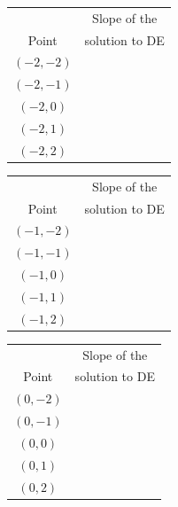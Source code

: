 \documentclass[12pt]{article}
\newcommand{\<}{\langle}
\renewcommand{\>}{\rangle}
\begin{document}
\begin{enumerate}
		\begin{center}
			\begin{tabular}{|c|c|}
				\hline
							& Slope of the	\\
				Point	& solution to DE\\
				\hline
				\hline
				$(-2, -2)$	& \\
				\hline
				$(-2, -1)$	& \\
				\hline
				$(-2, 0)$	& \\
				\hline
				$(-2, 1)$	& \\
				\hline
				$(-2, 2)$	& \\
				\hline
			\end{tabular}
			\hspace{0.5cm}
			\begin{tabular}{|c|c|}
				\hline
							& Slope of the	\\
				Point	& solution to DE\\
				\hline
				\hline
				$(-1, -2)$	& \\
				\hline
				$(-1, -1)$	& \\
				\hline
				$(-1, 0)$	& \\
				\hline
				$(-1, 1)$	& \\
				\hline
				$(-1, 2)$	& \\
				\hline
			\end{tabular}
			\hspace{0.5cm}
			\begin{tabular}{|c|c|}
				\hline
							& Slope of the	\\
				Point	& solution to DE\\
				\hline
				\hline
				$(0, -2)$	& \\
				\hline
				$(0, -1)$	& \\
				\hline
				$(0, 0)$	& \\
				\hline
				$(0, 1)$	& \\
				\hline
				$(0, 2)$	& \\
				\hline
			\end{tabular}
			
			\medskip
			

\end{center}
\end{enumerate}
\end{document}
